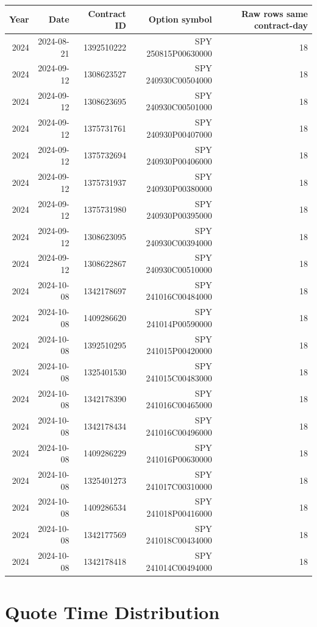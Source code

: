 \documentclass[11pt]{article}
\begin{document}
\begingroup
\scriptsize
\begin{longtable}{rrrrr}
\toprule
Year & Date & Contract ID & Option symbol & Raw rows same contract-day \\
\midrule
2024 & 2024-08-21 & 1392510222 & SPY   250815P00630000 & 18 \\
2024 & 2024-09-12 & 1308623527 & SPY   240930C00504000 & 18 \\
2024 & 2024-09-12 & 1308623695 & SPY   240930C00501000 & 18 \\
2024 & 2024-09-12 & 1375731761 & SPY   240930P00407000 & 18 \\
2024 & 2024-09-12 & 1375732694 & SPY   240930P00406000 & 18 \\
2024 & 2024-09-12 & 1375731937 & SPY   240930P00380000 & 18 \\
2024 & 2024-09-12 & 1375731980 & SPY   240930P00395000 & 18 \\
2024 & 2024-09-12 & 1308623095 & SPY   240930C00394000 & 18 \\
2024 & 2024-09-12 & 1308622867 & SPY   240930C00510000 & 18 \\
2024 & 2024-10-08 & 1342178697 & SPY   241016C00484000 & 18 \\
2024 & 2024-10-08 & 1409286620 & SPY   241014P00590000 & 18 \\
2024 & 2024-10-08 & 1392510295 & SPY   241015P00420000 & 18 \\
2024 & 2024-10-08 & 1325401530 & SPY   241015C00483000 & 18 \\
2024 & 2024-10-08 & 1342178390 & SPY   241016C00465000 & 18 \\
2024 & 2024-10-08 & 1342178434 & SPY   241016C00496000 & 18 \\
2024 & 2024-10-08 & 1409286229 & SPY   241016P00630000 & 18 \\
2024 & 2024-10-08 & 1325401273 & SPY   241017C00310000 & 18 \\
2024 & 2024-10-08 & 1409286534 & SPY   241018P00416000 & 18 \\
2024 & 2024-10-08 & 1342177569 & SPY   241018C00434000 & 18 \\
2024 & 2024-10-08 & 1342178418 & SPY   241014C00494000 & 18 \\
\bottomrule
\end{longtable}
\endgroup

\section*{Quote Time Distribution}
\end{document}
